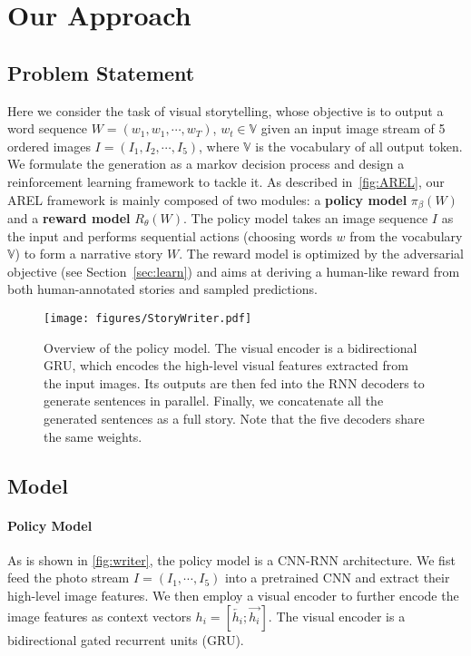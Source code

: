 \documentclass[11pt,a4paper]{article}
\begin{document}
\section{Our Approach}
\subsection{Problem Statement}
Here we consider the task of visual storytelling, whose objective is to output a word sequence $W=(w_1, w_1, \cdots, w_T)$, $w_t \in \mathbb{V}$ given an input image stream of 5 ordered images $I=(I_1, I_2, \cdots, I_5)$, where $\mathbb{V}$ is the vocabulary of all output token. We formulate the generation as a markov decision process and design a reinforcement learning framework to tackle it. As described in~\autoref{fig:AREL}, our AREL framework is mainly composed of two modules: a \textbf{policy model} $\pi_{\beta}(W)$ and a \textbf{reward model} $R_{\theta}(W)$. The policy model takes an image sequence $I$ as the input and performs sequential actions (choosing words $w$ from the vocabulary $\mathbb{V}$) to form a narrative story $W$. The reward model is optimized by the adversarial objective (see Section~\ref{sec:learn}) and aims at deriving a human-like reward from both human-annotated stories and sampled predictions.
\begin{figure}[!t]
\begin{center}
\texttt{[image: figures/StoryWriter.pdf]}  
\end{center}
\caption{Overview of the policy model. The visual encoder is a bidirectional GRU, which encodes the high-level visual features extracted from the input images. Its outputs are then fed into the RNN decoders to generate sentences in parallel. Finally, we concatenate all the generated sentences as a full story. Note that the five decoders share the same weights.}
\label{fig:writer}
\end{figure}

\subsection{Model}
\paragraph{Policy Model} As is shown in \autoref{fig:writer}, the policy model is a CNN-RNN architecture. We fist feed the photo stream $I = (I_1, \cdots, I_5)$ into a pretrained CNN and extract their high-level image features. We then employ a visual encoder to further encode the image features as context vectors $h_i=[\overleftarrow{h_i};\overrightarrow{h_i}]$. The visual encoder is a bidirectional gated recurrent units (GRU). 
\end{document}
